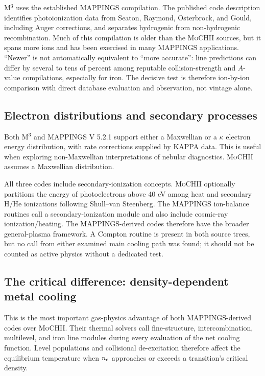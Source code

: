 \documentclass[english,a4paper]{my_memo}
\newcommand{\MoCHII}{\textsc{MoCHII}}
\newcommand{\Mthree}{M$^3$}
\newcommand{\Mappings}{MAPPINGS V 5.2.1}
\newcommand{\nelec}{n_{\rm e}}
\begin{document}
\Mthree{} uses the established MAPPINGS compilation.  The published code
description identifies photoionization data from Seaton, Raymond,
Osterbrock, and Gould, including Auger corrections, and separates hydrogenic from
non-hydrogenic recombination.  Much of this compilation is older than the
\MoCHII{} sources, but it spans more ions and has been exercised in many
MAPPINGS applications.  ``Newer'' is not automatically equivalent to
``more accurate'': line predictions can differ by several to tens of
percent among reputable collision-strength and $A$-value compilations,
especially for iron.  The decisive test is therefore ion-by-ion
comparison with direct database evaluation and observation, not vintage
alone.

\subsection{Electron distributions and secondary processes}

Both \Mthree{} and \Mappings{} support either a Maxwellian or a $\kappa$
electron energy distribution, with rate corrections supplied by KAPPA
data.  This is
useful when exploring non-Maxwellian interpretations of nebular
diagnostics.  \MoCHII{} assumes a Maxwellian distribution.

All three codes include secondary-ionization concepts.  \MoCHII{} optionally
partitions the energy of photoelectrons above 40 eV among heat and
secondary H/He ionizations following Shull--van Steenberg.  The MAPPINGS
ion-balance routines call a secondary-ionization module and also include
cosmic-ray ionization/heating.  The MAPPINGS-derived codes therefore have
the broader general-plasma framework.  A Compton routine is present in
both source trees, but no call from either examined main cooling path was
found; it should not be counted as active physics without a dedicated test.

\subsection{The critical difference: density-dependent metal cooling}
\label{sec:densitycool}

This is the most important gas-physics advantage of both MAPPINGS-derived
codes over \MoCHII{}.  Their thermal solvers call fine-structure,
intercombination, multilevel, and iron line
modules during every evaluation of the net cooling function.  Level
populations and collisional de-excitation therefore affect the equilibrium
temperature when $\nelec$ approaches or exceeds a transition's critical
density.
\end{document}

